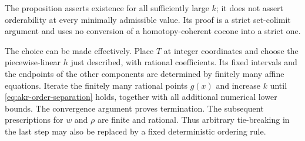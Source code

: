 \begin{remark}
\label{C:ordered-necklace-scope}
The proposition asserts existence for all sufficiently large $k$;
it does not assert orderability at every minimally admissible value.
Its proof is a strict set-colimit argument and uses no conversion
of a homotopy-coherent cocone into a strict one.

The choice can be made effectively. Place $T$ at integer coordinates
and choose the piecewise-linear $h$ just described, with rational
coefficients. Its fixed intervals and the endpoints of the other
components are determined by finitely many affine equations. Iterate
the finitely many rational points $g(x)$ and increase $k$ until
\eqref{eq:akr-order-separation} holds, together with all additional
numerical lower bounds. The convergence argument proves termination.
The subsequent prescriptions for $w$ and $\rho$ are finite and rational.
Thus arbitrary tie-breaking in the last step may also be replaced by
a fixed deterministic ordering rule.
\end{remark}

